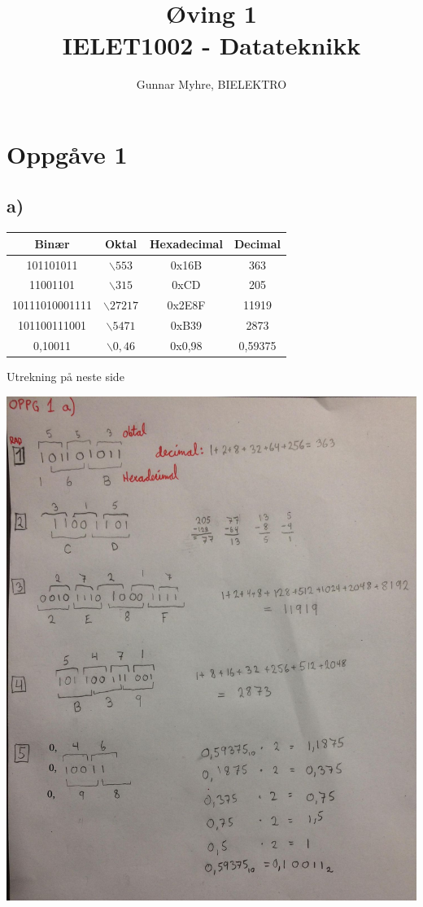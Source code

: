 \documentclass[12pt,a4paper]{article}
\title{%
	Øving 1 \\
	\large IELET1002 - Datateknikk \\
	}
\author{Gunnar Myhre, BIELEKTRO}
\begin{document}
	\maketitle
	\section{Oppgåve 1}
		\subsection{a)}
		\begin{center}
			\begin{tabular}{ |c|c|c|c| }
				\hline
				Binær	&	Oktal	&	Hexadecimal	&	Decimal \\
				\hline
				101101011	&	$\backslash553$	&	0x16B	&	363 \\
				\hline
				11001101	&	$\backslash315$	&	0xCD	&	205 \\
				\hline
				10111010001111	&	$\backslash27217$	&	0x2E8F	&	11919 \\
				\hline
				101100111001	&	$\backslash5471$	&	0xB39	&	2873 \\
				\hline
				0,10011	&	$\backslash0,46$	&	0x0,98	&	0,59375 \\
				\hline
			\end{tabular}
		\end{center}

		Utrekning på neste side

		\includegraphics[width=\textwidth]{01_1_a}
		\newpage
\end{document}
